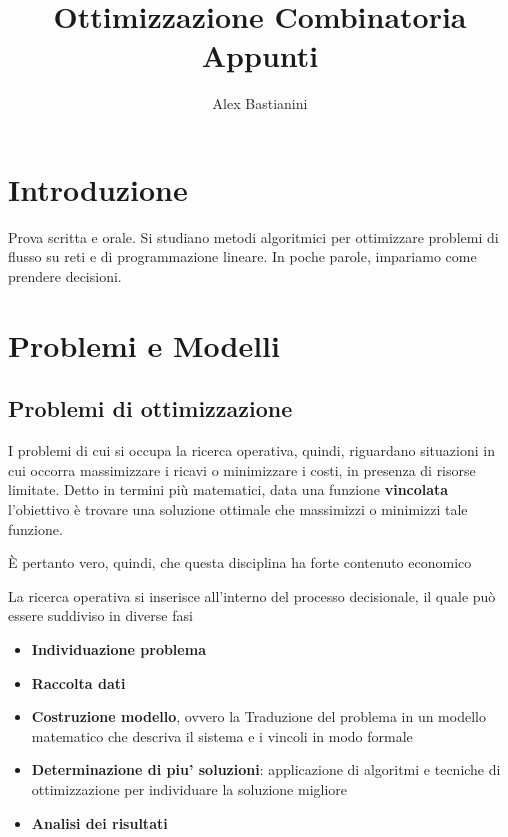 \documentclass{report}
\title{\Huge{Ottimizzazione Combinatoria}\\Appunti}
\author{\huge{Alex Bastianini}}
\date{}
\begin{document}
\maketitle
\newpage%
\tableofcontents

\pagebreak

\chapter{Introduzione}
Prova scritta e orale. Si studiano metodi algoritmici per ottimizzare problemi di flusso su reti e di programmazione lineare. In poche parole, impariamo come prendere decisioni.

\chapter{Problemi e Modelli}

\section{Problemi di ottimizzazione}




I problemi di cui si occupa la ricerca operativa, quindi, riguardano situazioni in cui occorra massimizzare i ricavi o minimizzare i costi, in presenza di risorse limitate. Detto in termini più matematici, data una funzione \textbf{vincolata} l'obiettivo è trovare una soluzione ottimale che massimizzi o minimizzi tale funzione.

È pertanto vero, quindi, che questa disciplina ha forte contenuto economico

La ricerca operativa si inserisce all'interno del processo decisionale, il quale può essere suddiviso in diverse fasi
\begin{itemize}
\item \textbf{Individuazione problema}
  \item \textbf{Raccolta dati}
    \item \textbf{Costruzione modello}, ovvero la Traduzione del problema in un modello matematico che descriva il sistema e i vincoli in modo formale
      \item \textbf{Determinazione di piu' soluzioni}: applicazione di algoritmi e tecniche di ottimizzazione per individuare la soluzione migliore 
  \item \textbf{Analisi dei risultati}
\end{itemize}
\end{document}

